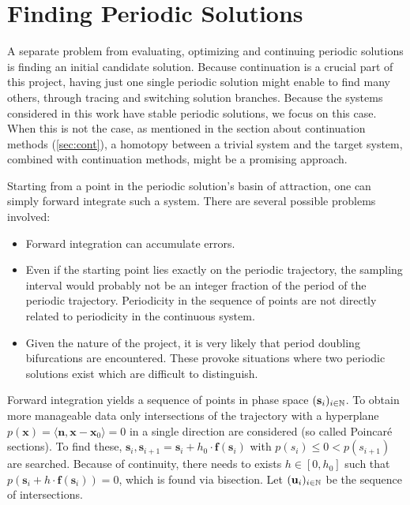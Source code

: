 \section{Finding Periodic Solutions}

A separate problem from evaluating, optimizing and continuing periodic solutions is finding an initial candidate solution.
Because continuation is a crucial part of this project, having just one single periodic solution might enable to find many others, through tracing and switching solution branches.
Because the systems considered in this work have stable periodic solutions, we focus on this case.
When this is not the case, as mentioned in the section about continuation methods (\autoref{sec:cont}), a homotopy between a trivial system and the target system, combined with continuation methods, might be a promising approach.

Starting from a point in the periodic solution's basin of attraction, one can simply forward integrate such a system.
There are several possible problems involved:
\begin{itemize}
	\item Forward integration can accumulate errors.
	\item Even if the starting point lies exactly on the periodic trajectory, the sampling interval would probably not be an integer fraction of the period of the periodic trajectory.
		Periodicity in the sequence of points are not directly related to periodicity in the continuous system.
	\item Given the nature of the project, it is very likely that period doubling bifurcations are encountered.
		These provoke situations where two periodic solutions exist which are difficult to distinguish.
\end{itemize}

Forward integration yields a sequence of points in phase space $(\textbf{s}_i)_{i \in \mathbb{N}}$.
To obtain more manageable data only intersections of the trajectory with a hyperplane $p(\textbf{x}) = \langle \textbf{n}, \textbf{x}-\textbf{x}_0 \rangle = 0$ in a single direction are considered (so called Poincaré sections).
To find these, $\textbf{s}_i, \textbf{s}_{i+1} = \textbf{s}_i + h_0 \cdot \textbf{f}(\textbf{s}_i)$ with $p(s_i) \le 0 < p(s_{i+1})$ are searched.
Because of continuity, there needs to exists $h \in [0,h_0]$ such that $p(\textbf{s}_i + h \cdot \textbf{f}(\textbf{s}_i)) = 0$, which is found via bisection.
Let $(\textbf{u}_i)_{i \in \mathbb{N}}$ be the sequence of intersections.

